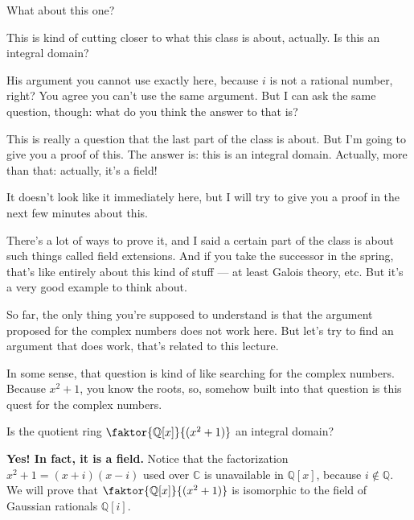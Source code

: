 \begin{speech}[01:18:56 - 01:20:11]
What about this one?  

This is kind of cutting closer to what this class is about, actually. Is this an integral domain? 

His argument you cannot use exactly here, because $i$ is not a rational number, right? You agree you can't use the same argument. But I can ask the same question, though: what do you think the answer to that is? 

This is really a question that the last part of the class is about. But I'm going to give you a proof of this. The answer is: this is an integral domain.  Actually, more than that:  actually, it's a field! 

It doesn't look like it immediately here, but I will try to give you a proof in the next few minutes about this. 

There's a lot of ways to prove it, and I said a certain part of the class is about such things called field extensions. And if you take the successor in the spring, that's like entirely about this kind of stuff --- at least Galois theory, etc. But it's a very good example to think about.
\end{speech}

\begin{speech}[01:20:11 - 01:20:56]
So far, the only thing you're supposed to understand is that the argument proposed for the complex numbers does not work here. But let's try to find an argument that does work, that's related to this lecture. 

In some sense, that question is kind of like searching for the complex numbers. Because $x^2 + 1$, you know the roots, so, somehow built into that question is this quest for the complex numbers.
\end{speech}

\begin{content}
\begin{question}
Is the quotient ring $\faktor{\mathbb{Q}[x]}{(x^2 + 1)}$ an integral domain?
\end{question}

\begin{answer}
\textbf{Yes! In fact, it is a field.}
Notice that the factorization $x^2 + 1 = (x + i)(x - i)$ used over $\mathbb{C}$ is unavailable in $\mathbb{Q}[x]$, because $i \notin \mathbb{Q}$. We will prove that $\faktor{\mathbb{Q}[x]}{(x^2 + 1)}$ is isomorphic to the field of Gaussian rationals $\mathbb{Q}[i]$.
\end{answer}
\end{content}

